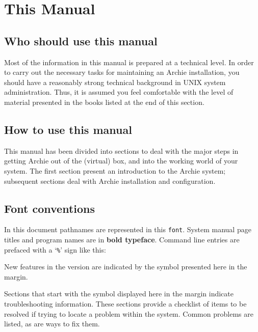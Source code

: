 %
%
%
%

\chapter{This Manual}

\section{Who should use this manual}

Most of the information in this manual is prepared at a technical level. In
order to carry out the necessary tasks for maintaining an Archie installation,
you should have a reasonably strong technical background in UNIX system
administration. Thus, it is assumed you feel comfortable with the level of
material presented in the books listed at the end of this section.

\section{How to use this manual}

This manual has been divided into sections to deal with the major steps in
getting Archie out of the (virtual) box, and into the working world of your
system. The first section present an introduction to the Archie system;
subsequent sections deal with Archie installation and configuration.

\section{Font conventions}
In this document pathnames are represented in this \texttt{font}.
System manual page
titles and program names are in \textbf{bold typeface}.
Command line entries are
prefaced with a `\texttt{\%}' sign like this:



New features in the version \version are indicated by the symbol presented
here in the margin. \new





\NOTE Sections that start with the symbol displayed here in the margin
indicate troubleshooting information. These sections provide a checklist of
items to be resolved if trying to locate a problem within the system. Common
problems are listed, as are ways to fix them. 

